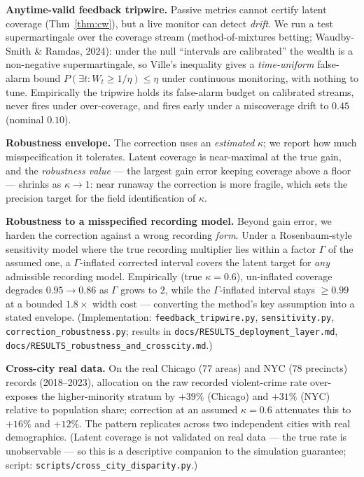 \documentclass[10pt]{article}
\begin{document}
\textbf{Anytime-valid feedback tripwire.} Passive metrics cannot certify latent
coverage (Thm~\ref{thm:cw}), but a live monitor can detect \emph{drift}. We run a
test supermartingale over the coverage stream (method-of-mixtures betting;
Waudby-Smith \& Ramdas, 2024): under the null ``intervals are calibrated'' the
wealth is a non-negative supermartingale, so Ville's inequality gives a
\emph{time-uniform} false-alarm bound
$P(\exists t: W_t\!\ge\!1/\eta)\le\eta$ under continuous monitoring, with nothing
to tune. Empirically the tripwire holds its false-alarm budget on calibrated
streams, never fires under over-coverage, and fires early under a miscoverage
drift to $0.45$ (nominal $0.10$).

\textbf{Robustness envelope.} The correction uses an \emph{estimated} $\kappa$;
we report how much misspecification it tolerates. Latent coverage is
near-maximal at the true gain, and the \emph{robustness value} --- the largest
gain error keeping coverage above a floor --- shrinks as $\kappa\!\to\!1$: near
runaway the correction is more fragile, which sets the precision target for the
field identification of $\kappa$.

\textbf{Robustness to a misspecified recording model.} Beyond gain error, we
harden the correction against a wrong recording \emph{form}. Under a
Rosenbaum-style sensitivity model where the true recording multiplier lies within
a factor $\Gamma$ of the assumed one, a $\Gamma$-inflated corrected interval
covers the latent target for \emph{any} admissible recording model. Empirically
(true $\kappa{=}0.6$), un-inflated coverage degrades $0.95\!\to\!0.86$ as
$\Gamma$ grows to $2$, while the $\Gamma$-inflated interval stays $\ge 0.99$ at a
bounded $1.8\times$ width cost --- converting the method's key assumption into a
stated envelope. (Implementation: \texttt{feedback\_tripwire.py},
\texttt{sensitivity.py}, \texttt{correction\_robustness.py}; results in
\texttt{docs/RESULTS\_deployment\_layer.md},
\texttt{docs/RESULTS\_robustness\_and\_crosscity.md}.)

\textbf{Cross-city real data.} On the real Chicago (77 areas) and NYC (78
precincts) records (2018--2023), allocation on the raw recorded violent-crime
rate over-exposes the higher-minority stratum by $+39\%$ (Chicago) and $+31\%$
(NYC) relative to population share; correction at an assumed $\kappa{=}0.6$
attenuates this to $+16\%$ and $+12\%$. The pattern replicates across two
independent cities with real demographics. (Latent coverage is not validated on
real data --- the true rate is unobservable --- so this is a descriptive
companion to the simulation guarantee; script:
\texttt{scripts/cross\_city\_disparity.py}.)
\end{document}
